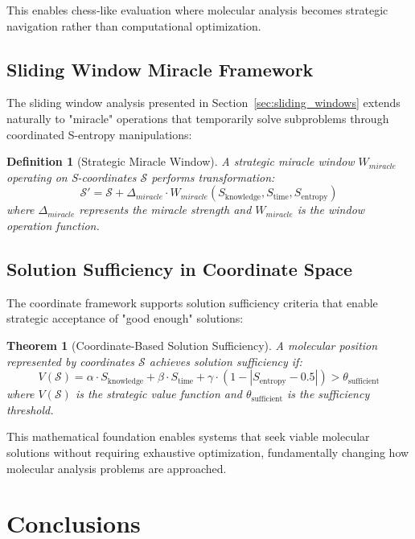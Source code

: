 \documentclass[12pt,a4paper]{article}
\newtheorem{theorem}{Theorem}
\newtheorem{definition}{Definition}
\begin{document}
This enables chess-like evaluation where molecular analysis becomes strategic navigation rather than computational optimization.

\subsection{Sliding Window Miracle Framework}

The sliding window analysis presented in Section~\ref{sec:sliding_windows} extends naturally to "miracle" operations that temporarily solve subproblems through coordinated S-entropy manipulations:

\begin{definition}[Strategic Miracle Window]
A strategic miracle window $W_{miracle}$ operating on S-coordinates $\mathcal{S}$ performs transformation:
$$\mathcal{S}' = \mathcal{S} + \Delta_{miracle} \cdot W_{miracle}(S_{\text{knowledge}}, S_{\text{time}}, S_{\text{entropy}})$$
where $\Delta_{miracle}$ represents the miracle strength and $W_{miracle}$ is the window operation function.
\end{definition}

\subsection{Solution Sufficiency in Coordinate Space}

The coordinate framework supports solution sufficiency criteria that enable strategic acceptance of "good enough" solutions:

\begin{theorem}[Coordinate-Based Solution Sufficiency]
A molecular position represented by coordinates $\mathcal{S}$ achieves solution sufficiency if:
$$V(\mathcal{S}) = \alpha \cdot S_{\text{knowledge}} + \beta \cdot S_{\text{time}} + \gamma \cdot (1 - |S_{\text{entropy}} - 0.5|) > \theta_{\text{sufficient}}$$
where $V(\mathcal{S})$ is the strategic value function and $\theta_{\text{sufficient}}$ is the sufficiency threshold.
\end{theorem}

This mathematical foundation enables systems that seek viable molecular solutions without requiring exhaustive optimization, fundamentally changing how molecular analysis problems are approached.

\section{Conclusions}
\end{document}

